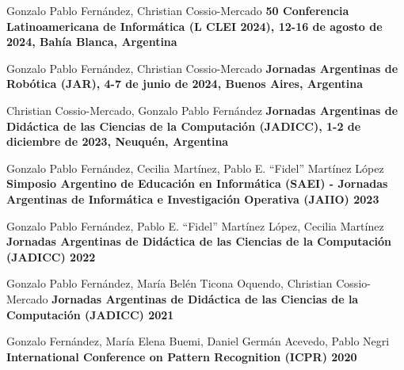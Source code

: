 
  {Gonzalo Pablo Fernández, Christian Cossio-Mercado}
  {\textbf{50 Conferencia Latinoamericana de Informática (L CLEI 2024), 12-16 de agosto de 2024, Bahía
  Blanca, Argentina}}

    \sepspace

  {Gonzalo Pablo Fernández, Christian Cossio-Mercado}
  {\textbf{Jornadas Argentinas de Robótica (JAR), 4-7 de junio de 2024, Buenos Aires, Argentina}}

    \sepspace

  {Christian Cossio-Mercado, Gonzalo Pablo Fernández}
  {\textbf{Jornadas Argentinas de Didáctica de las Ciencias de la Computación (JADICC), 1-2 de diciembre de 2023, Neuquén, Argentina}}

    \sepspace

  {Gonzalo Pablo Fernández, Cecilia Martínez, Pablo E. ``Fidel'' Martínez López}
  {\textbf{Simposio Argentino de Educación en Informática (SAEI) - Jornadas Argentinas de Informática e Investigación Operativa (JAIIO) 2023}}

    \sepspace

  {Gonzalo Pablo Fernández, Pablo E. ``Fidel'' Martínez López, Cecilia Martínez}
  {\textbf{Jornadas Argentinas de Didáctica de las Ciencias de la Computación (JADICC) 2022}}

    \sepspace

  {Gonzalo Pablo Fernández, María Belén Ticona Oquendo, Christian Cossio-Mercado}
  {\textbf{Jornadas Argentinas de Didáctica de las Ciencias de la Computación (JADICC) 2021}}

    \sepspace
\newpage
  {Gonzalo Fernández, María Elena Buemi, Daniel Germán Acevedo, Pablo Negri}
  {\textbf{International Conference on Pattern Recognition (ICPR) 2020}}